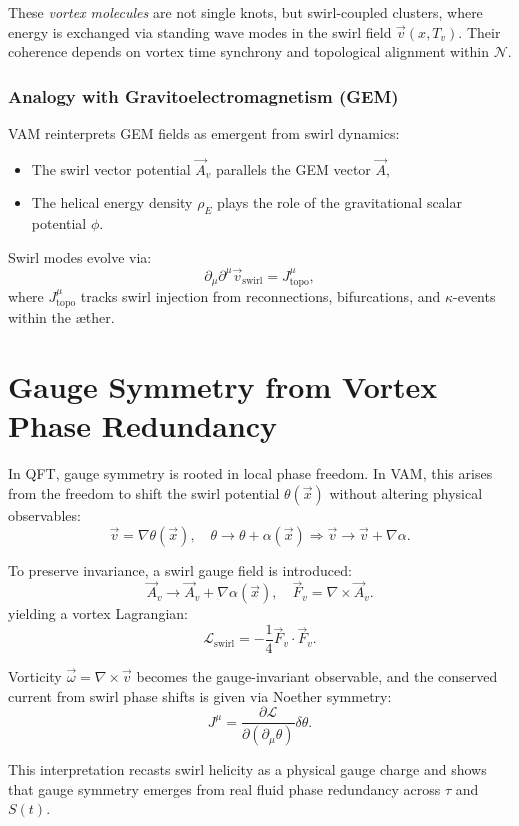 \documentclass[12pt]{article}
\begin{document}
These \textit{vortex molecules} are not single knots, but swirl-coupled clusters, where energy is exchanged via standing wave modes in the swirl field \( \vec{v}(x, T_v) \). Their coherence depends on vortex time synchrony and topological alignment within $\mathcal{N}$.

\subsubsection*{Analogy with Gravitoelectromagnetism (GEM)}

VAM reinterprets GEM fields as emergent from swirl dynamics:
\begin{itemize}
  \item The swirl vector potential \( \vec{A}_v \) parallels the GEM vector \( \vec{A} \),
  \item The helical energy density \( \rho_{\scriptscriptstyle\boldsymbol\!E}\) plays the role of the gravitational scalar potential \( \phi \).
\end{itemize}

Swirl modes evolve via:
\[
\partial_\mu \partial^\mu \vec{v}_\text{swirl} = J^\mu_\text{topo},
\]
where \( J^\mu_\text{topo} \) tracks swirl injection from reconnections, bifurcations, and $ \kappa $-events within the æther.

\section*{Gauge Symmetry from Vortex Phase Redundancy}

In QFT, gauge symmetry is rooted in local phase freedom. In VAM, this arises from the freedom to shift the swirl potential \( \theta(\vec{x}) \) without altering physical observables:
\[
\vec{v} = \nabla \theta(\vec{x}), \quad \theta \to \theta + \alpha(\vec{x}) \Rightarrow \vec{v} \to \vec{v} + \nabla \alpha.
\]

To preserve invariance, a swirl gauge field is introduced:
\[
\vec{A}_v \rightarrow \vec{A}_v + \nabla \alpha(\vec{x}), \quad \vec{F}_v = \nabla \times \vec{A}_v.
\]
yielding a vortex Lagrangian:
\[
\mathcal{L}_\text{swirl} = -\frac{1}{4} \vec{F}_v \cdot \vec{F}_v.
\]

Vorticity \( \vec{\omega} = \nabla \times \vec{v} \) becomes the gauge-invariant observable, and the conserved current from swirl phase shifts is given via Noether symmetry:
\[
J^\mu = \frac{\partial \mathcal{L}}{\partial(\partial_\mu \theta)} \delta \theta.
\]

This interpretation recasts swirl helicity as a physical gauge charge and shows that gauge symmetry emerges from real fluid phase redundancy across $\tau$ and $S(t)$.
\end{document}

